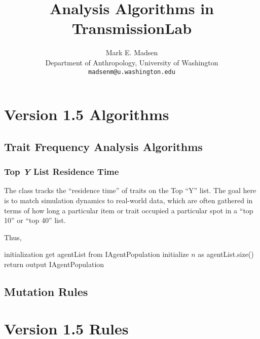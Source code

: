 \documentclass{article}
\begin{document}
\title{Analysis Algorithms in TransmissionLab} 
\maketitle


\author{Mark E. Madsen\\ Department of Anthropology, University of Washington\\\texttt{madsenm@u.washington.edu}}







\section{Version 1.5 Algorithms}
\subsection{Trait Frequency Analysis Algorithms}

\subsubsection{Top \emph{Y} List Residence Time}
The class  tracks the ``residence time'' of traits on the Top ``Y'' list.  The goal here is to match simulation dynamics to real-world data, which are often gathered in terms of how long a particular item or trait occupied a particular spot in a ``top 10'' or ``top 40'' list.  

Thus, 

\vskip 0.25in




\begin{algorithm}[H]
\SetLine
{}
initialization\;
get agentList from IAgentPopulation\;
initialize $n$ as agentList.size()\;
return output IAgentPopulation\;
\end{algorithm}

\subsection{Mutation Rules}


\section{Version 1.5 Rules}
\end{document}

